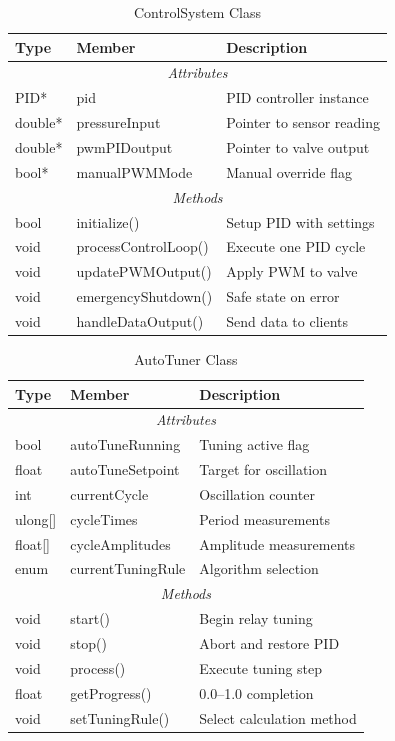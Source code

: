 \documentclass[12pt,a4paper]{article}
\begin{document}
\begin{table}[H]
\centering
\caption{ControlSystem Class}
\label{tab:control-system}
\begin{tabular}{|l|l|p{6cm}|}
\hline
\textbf{Type} & \textbf{Member} & \textbf{Description} \\
\hline
\multicolumn{3}{|c|}{\textit{Attributes}} \\
\hline
PID* & pid & PID controller instance \\
double* & pressureInput & Pointer to sensor reading \\
double* & pwmPIDoutput & Pointer to valve output \\
bool* & manualPWMMode & Manual override flag \\
\hline
\multicolumn{3}{|c|}{\textit{Methods}} \\
\hline
bool & initialize() & Setup PID with settings \\
void & processControlLoop() & Execute one PID cycle \\
void & updatePWMOutput() & Apply PWM to valve \\
void & emergencyShutdown() & Safe state on error \\
void & handleDataOutput() & Send data to clients \\
\hline
\end{tabular}
\end{table}

\begin{table}[H]
\centering
\caption{AutoTuner Class}
\label{tab:auto-tuner}
\begin{tabular}{|l|l|p{6cm}|}
\hline
\textbf{Type} & \textbf{Member} & \textbf{Description} \\
\hline
\multicolumn{3}{|c|}{\textit{Attributes}} \\
\hline
bool & autoTuneRunning & Tuning active flag \\
float & autoTuneSetpoint & Target for oscillation \\
int & currentCycle & Oscillation counter \\
ulong[] & cycleTimes & Period measurements \\
float[] & cycleAmplitudes & Amplitude measurements \\
enum & currentTuningRule & Algorithm selection \\
\hline
\multicolumn{3}{|c|}{\textit{Methods}} \\
\hline
void & start() & Begin relay tuning \\
void & stop() & Abort and restore PID \\
void & process() & Execute tuning step \\
float & getProgress() & 0.0--1.0 completion \\
void & setTuningRule() & Select calculation method \\
\hline
\end{tabular}
\end{table}
\end{document}
